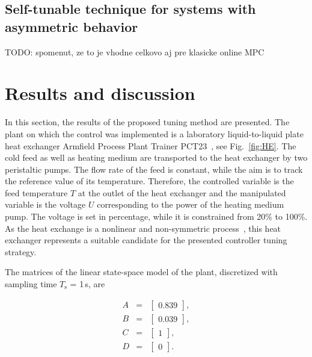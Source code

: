 \documentclass[preprint,12pt]{elsarticle}
\begin{document}
\subsection{Self-tunable technique for systems with asymmetric behavior}
\label{sec:self_tunable_new}

TODO: spomenut, ze to je vhodne celkovo aj pre klasicke online MPC

\section{Results and discussion}
\label{sec:results}

In this section, the results of the proposed tuning method are presented. The plant on which the control was implemented is a laboratory liquid-to-liquid plate heat exchanger Armfield Process Plant Trainer PCT23~\cite{pct23}, see Fig.~\ref{fig:HE}. The cold feed as well as heating medium are transported to the heat exchanger by two peristaltic pumps. The flow rate of the feed is constant, while the aim is to track the reference value of its temperature. Therefore, the controlled variable is the feed temperature $T$ at the outlet of the heat exchanger and the manipulated variable is the voltage $U$ corresponding to the power of the heating medium pump. The voltage is set in percentage, while it is constrained from 20\% to 100\%. As the heat exchange is a nonlinear and non-symmetric process~\cite{Liptak}, this heat exchanger represents a suitable candidate for the presented controller tuning strategy.  

The matrices of the linear state-space model of the plant, discretized with sampling time $T_\mathrm{s}$ = 1\,s, are

\begin{subequations}
	\label{eq:model_A_B} 
	\begin{eqnarray}
		A&=&\begin{bmatrix}
			0.839
		\end{bmatrix}, \\
		B&=&\begin{bmatrix}
			0.039
		\end{bmatrix}, \\
		C&=&\begin{bmatrix}
			1
		\end{bmatrix}, \\
		D&=&\begin{bmatrix}
			0
		\end{bmatrix}.
		\end{eqnarray}
\end{subequations}
\end{document}

